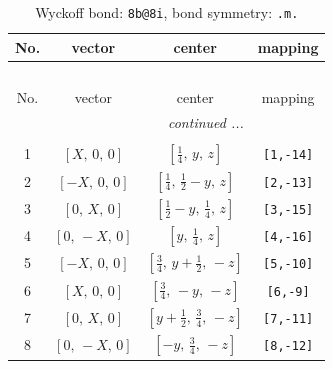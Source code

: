 \documentclass[fleqn,8pt]{jsarticle}
\begin{document}
\begin{longtable}{cccc}
\caption{Wyckoff bond: {\tt 8b@8i}, bond symmetry: {\tt .m.}}
 \\
 \hline \hline
No. & vector & center & mapping \\ \hline \endfirsthead

\multicolumn{3}{l}{\tablename\ \thetable{}} \\
 \hline \hline
No. & vector & center & mapping \\ \hline \endhead

 \hline \hline
\multicolumn{3}{r}{\footnotesize\it continued ...} \\ \endfoot

 \hline \hline
\multicolumn{3}{r}{} \\ \endlastfoot

1 & $\left[ X,\, 0,\, 0 \right]$ & $\left[ \frac{1}{4},\, y,\, z \right]$ & {\tt [1,-14]} \\ \hline
2 & $\left[ - X,\, 0,\, 0 \right]$ & $\left[ \frac{1}{4},\, \frac{1}{2} - y,\, z \right]$ & {\tt [2,-13]} \\ \hline
3 & $\left[ 0,\, X,\, 0 \right]$ & $\left[ \frac{1}{2} - y,\, \frac{1}{4},\, z \right]$ & {\tt [3,-15]} \\ \hline
4 & $\left[ 0,\, - X,\, 0 \right]$ & $\left[ y,\, \frac{1}{4},\, z \right]$ & {\tt [4,-16]} \\ \hline
5 & $\left[ - X,\, 0,\, 0 \right]$ & $\left[ \frac{3}{4},\, y + \frac{1}{2},\, - z \right]$ & {\tt [5,-10]} \\ \hline
6 & $\left[ X,\, 0,\, 0 \right]$ & $\left[ \frac{3}{4},\, - y,\, - z \right]$ & {\tt [6,-9]} \\ \hline
7 & $\left[ 0,\, X,\, 0 \right]$ & $\left[ y + \frac{1}{2},\, \frac{3}{4},\, - z \right]$ & {\tt [7,-11]} \\ \hline
8 & $\left[ 0,\, - X,\, 0 \right]$ & $\left[ - y,\, \frac{3}{4},\, - z \right]$ & {\tt [8,-12]} \\
\end{longtable}
\renewcommand{\arraystretch}{1.2}
\end{document}
